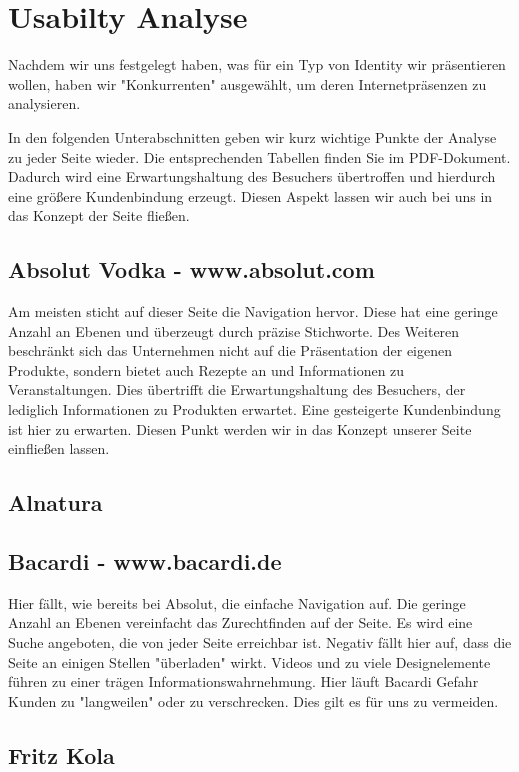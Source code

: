 \documentclass[12pt,a4paper,oneside,ngerman]{article}
\begin{document}
\newpage %
\section{Usabilty Analyse}
Nachdem wir uns festgelegt haben, was für ein Typ von Identity wir präsentieren wollen, haben wir "Konkurrenten" ausgewählt, um deren Internetpräsenzen zu analysieren. 

In den folgenden Unterabschnitten geben wir kurz wichtige Punkte der Analyse zu jeder Seite wieder. Die entsprechenden Tabellen finden Sie im PDF-Dokument. %
Dadurch wird eine Erwartungshaltung des Besuchers übertroffen und hierdurch eine größere Kundenbindung erzeugt. Diesen Aspekt lassen wir auch bei uns in das Konzept der Seite fließen.
\subsection{Absolut Vodka - www.absolut.com}
Am meisten sticht auf dieser Seite die Navigation hervor. Diese hat eine geringe Anzahl an Ebenen und überzeugt durch präzise Stichworte. Des Weiteren beschränkt sich das Unternehmen nicht auf die Präsentation der eigenen Produkte, sondern bietet auch Rezepte an und Informationen zu Veranstaltungen. Dies übertrifft die Erwartungshaltung des Besuchers, der lediglich Informationen zu Produkten erwartet. Eine gesteigerte Kundenbindung ist hier zu erwarten. Diesen Punkt werden wir in das Konzept unserer Seite einfließen lassen.
\subsection{Alnatura}

\subsection{Bacardi - www.bacardi.de}
Hier fällt, wie bereits bei Absolut, die einfache Navigation auf. Die geringe Anzahl an Ebenen vereinfacht das Zurechtfinden auf der Seite. Es wird eine Suche angeboten, die von jeder Seite erreichbar ist. Negativ fällt hier auf, dass die Seite an einigen Stellen "überladen" wirkt. Videos und zu viele Designelemente führen zu einer trägen Informationswahrnehmung. Hier läuft Bacardi Gefahr Kunden zu "langweilen" oder zu verschrecken. Dies gilt es für uns zu vermeiden.
\subsection{Fritz Kola}
\end{document}
